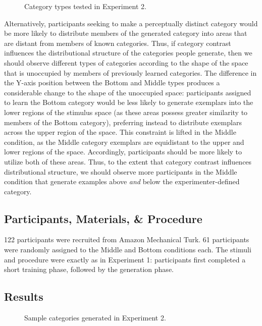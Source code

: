 \documentclass[12pt]{article}
\newcommand\inputpgf[2]{{
\let\pgfimageWithoutPath\pgfimage
\renewcommand{\pgfimage}[2][]{\pgfimageWithoutPath[##1]{#1/##2}}

}}
\begin{document}
\begin{flushleft}
\begin{figure}
    \begin{center}
    
    \caption{Category types tested in Experiment 2.}
    \label{fig:e2-conditions}
    \end{center}
\end{figure}


Alternatively, participants seeking to make a perceptually distinct category would be more likely to distribute members of the generated category into areas that are distant from members of known categories. Thus, if category contrast influences the distributional structure of the categories people generate, then we should observe different types of categories according to the shape of the space that is unoccupied by members of previously learned categories. The difference in the Y-axis position between the Bottom and Middle types produces a considerable change to the shape of the unoccupied space: participants assigned to learn the Bottom category would be less likely to generate exemplars into the lower regions of the stimulus space (as these areas possess greater similarity to members of the Bottom category), preferring instead to distribute exemplars across the upper region of the space. This constraint is lifted in the Middle condition, as the Middle category exemplars are equidistant to the upper and lower regions of the space. Accordingly, participants should be more likely to utilize both of these areas. Thus, to the extent that category contrast influences distributional structure, we should observe more participants in the Middle condition that generate examples above \textit{and} below the experimenter-defined category.

\subsection{Participants, Materials, \& Procedure}

122 participants were recruited from Amazon Mechanical Turk. 61 participants were randomly assigned to the Middle and Bottom conditions each. The stimuli and procedure were exactly as in Experiment 1: participants first completed a short training phase, followed by the generation phase.


\subsection{Results}

\begin{figure}
    \begin{center}
    \inputpgf{figs/}{e2-samples.pgf}
    \caption{Sample categories generated in Experiment 2. }
    \label{fig:e2-samples}
    \end{center}
\end{figure}


\end{flushleft}
\end{document}
